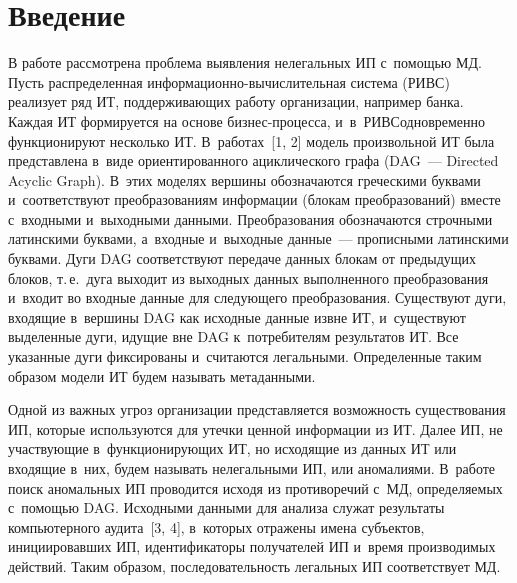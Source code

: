 
 
\vspace*{6pt}



\thispagestyle{headings}

\begin{multicols}{2}

\label{st\stat}
  
\section{Введение}

  В работе рассмотрена проблема выявления нелегальных
ИП с~по\-мощью МД. Пусть распределенная 
ин\-фор\-ма\-ци\-он\-но-вы\-чис\-ли\-тель\-ная сис\-те\-ма (РИВС) реализует 
ряд ИТ, поддерживающих работу организации, например банка. Каждая 
ИТ формируется на основе биз\-нес-про\-цес\-са, и~в~\mbox{РИВС}\linebreak одновременно 
функционируют несколько ИТ. В~работах~[1, 2] модель произвольной ИТ была 
представлена в~виде ориентированного ациклического графа (DAG~--- Directed 
Acyclic Graph). В~этих моделях вершины обозначаются греческими буквами 
и~соответствуют преобразованиям информации (блокам преобразований) вместе 
с~входными и~выходными данными. Преобразования обозначаются строчными 
латинскими буквами, а~входные и~выходные данные~--- прописными 
латинскими буквами. Дуги DAG соответствуют передаче данных блокам от 
предыдущих блоков, т.\,е.\ дуга выходит из выходных данных выполненного 
преобразования и~входит во входные данные для сле\-ду\-юще\-го преобразования. 
Существуют дуги, входящие в~вершины DAG как исходные данные извне ИТ, 
и~существуют выделенные дуги, идущие вне DAG к~потребителям результатов 
ИТ. Все указанные дуги фиксированы и~считаются легальными. Определенные 
таким образом модели ИТ будем называть метаданными.
  
  Одной из важных угроз организации пред\-став\-ля\-ет\-ся возможность 
существования ИП, которые используются для утечки ценной информации из ИТ. 
Далее ИП, не участвующие в~функционирующих ИТ, но исходящие из данных ИТ 
или входящие в~них, будем называть нелегальными ИП, или аномалиями. 
В~работе поиск аномальных ИП проводится исходя из противоречий с~МД, 
определяемых с~помощью DAG. Исходными данными для анализа служат 
результаты компьютерного аудита~[3, 4], в~которых отражены имена субъектов, 
инициировавших ИП, идентификаторы получателей ИП и~время производимых 
действий. Таким образом, последовательность легальных ИП соответствует МД. 
  

\end{multicols}
